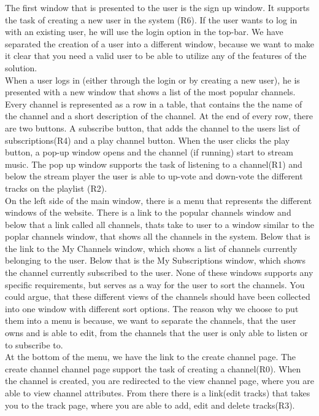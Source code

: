 \documentclass[a4paper,11pt,report]{article}
\begin{document}
{The first window that is presented to the user is the sign up window. It supports the task of creating a new user in the system (R6). If the user wants to log in with an existing user, he will use the login option in the top-bar. We have separated the creation of a user into a different window, because we want to make it clear that you need a valid user to be able to utilize any of the features of the solution.\\

When a user logs in (either through the login or by creating a new user), he is presented with a new window that shows a list of the most popular channels. Every channel is represented as a row in a table, that contains the the name of the channel and a short description of the channel. At the end of every row, there are two buttons. A subscribe button, that adds the channel to the users list of subscriptions(R4) and a play channel button. When the user clicks the play button, a pop-up window opens and the channel (if running) start to stream music. The pop up window supports the task of listening to a channel(R1) and below the stream player the user is able to up-vote and down-vote the different tracks on the playlist (R2).\\

On the left side of the main window, there is a menu that represents the different windows of the website. There is a link to the popular channels window and below that a link called all channels, thats take to user to a window similar to the poplar channels window, that shows all the channels in the system. Below that is the link to the My Channels window, which shows a list of channels currently belonging to the user. Below that is the My Subscriptions window, which shows the channel currently subscribed to the user. None of these windows supports any specific requirements, but serves as a way for the user to sort the channels. You could argue, that these different views of the channels should have been collected into one window with different sort options. The reason why we choose to put them into a menu is because, we want to separate the channels, that the user owns and is able to edit, from the channels that the user is only able to listen or to subscribe to.\\

At the bottom of the menu, we have the link to the create channel page. The create channel channel page support the task of creating a channel(R0). When the channel is created, you are redirected to the view channel page, where you are able to view channel attributes. From there there is a link(edit tracks) that takes you to the track page, where you are able to add, edit and delete tracks(R3).\\

}
\end{document}
